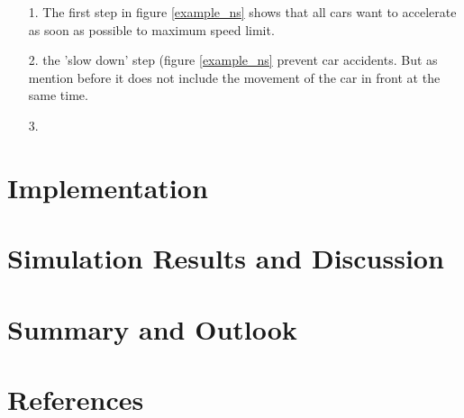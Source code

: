 \documentclass[11pt]{article}
\begin{document}
\begin{itemize}
\item[1.] The first step in figure \ref{example_ns} shows that all cars want to accelerate as soon as possible to maximum speed limit.
\item[2.] the 'slow down' step (figure \ref{example_ns} prevent car accidents. But as mention before it does not include the movement of the car in front at the same time.
\item[3.] 
\end{itemize}


\section{Implementation}

\section{Simulation Results and Discussion}

\section{Summary and Outlook}

\section{References}
\end{document}
